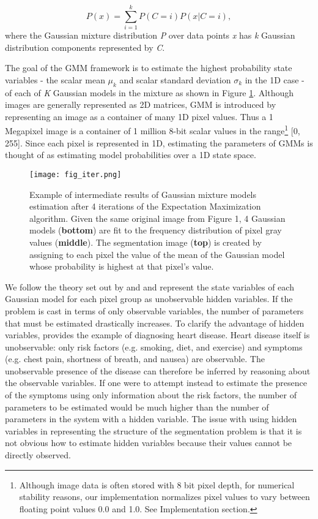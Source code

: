 \documentclass[conference]{IEEEtran}
\begin{document}
\begin{equation}
    P(x) = \sum_{i=1}^{k} P(C = i) P(x | C = i),
\end{equation} where the Gaussian mixture distribution \emph{P} over data points \emph{x} has \emph{k} Gaussian distribution components represented by \emph{C}. 

The goal of the GMM framework is to estimate the highest probability state variables - the scalar mean $\mu_k$ and scalar standard deviation $\sigma_k$ in the 1D case - of each of \emph{K} Gaussian models in the mixture as shown in Figure \ref{fig:fig_iter}. Although images are generally represented as 2D matrices, GMM is introduced by representing an image as a container of many 1D pixel values. Thus a 1 Megapixel image is a container of 1 million 8-bit scalar values in the range\footnote{Although image data is often stored with 8 bit pixel depth, for numerical stability reasons, our implementation normalizes pixel values to vary between floating point values 0.0 and 1.0. See Implementation section.} [0, 255]. Since each pixel is represented in 1D, estimating the parameters of GMMs is thought of as estimating model probabilities over a 1D state space.  

\begin{figure}[ht]
\centering
\texttt{[image: fig\_iter.png]}
\caption{Example of intermediate results of Gaussian mixture models estimation after 4 iterations of the Expectation Maximization algorithm. Given the same original image from Figure 1, 4 Gaussian models (\textbf{bottom}) are fit to the frequency distribution of pixel gray values (\textbf{middle}). The segmentation image (\textbf{top}) is created by assigning to each pixel the value of the mean of the Gaussian model whose probability is highest at that pixel's value.}
\label{fig:fig_iter}
\vfill
\end{figure}

We follow the theory set out by \cite{RussellNorvig} and \cite{PRML} and represent the state variables of each Gaussian model for each pixel group as unobservable hidden variables.  If the problem is cast in terms of only observable variables, the number of parameters that must be estimated drastically increases. To clarify the advantage of hidden variables, \cite{RussellNorvig} provides the example of diagnosing heart disease. Heart disease itself is unobservable: only risk factors (e.g. smoking, diet, and exercise) and symptoms (e.g. chest pain, shortness of breath, and nausea) are observable. The unobservable presence of the disease can therefore be inferred by reasoning about the observable variables. If one were to attempt instead to estimate the presence of the symptoms using only information about the risk factors, the number of parameters to be estimated would be much higher than the number of parameters in the system with a hidden variable. The issue with using hidden variables in representing the structure of the segmentation problem is that it is not obvious how to estimate hidden variables because their values cannot be directly observed. 
\end{document}
